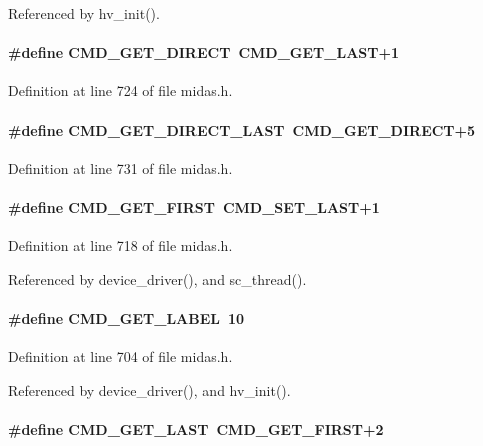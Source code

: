 Referenced by hv\_\-init().
\paragraph[{CMD\_\-GET\_\-DIRECT}]{\setlength{\rightskip}{0pt plus 5cm}\#define CMD\_\-GET\_\-DIRECT~CMD\_\-GET\_\-LAST+1}\hfill\label{group__err26_ga17b7364497ba59e4f52d2d5a5b37383f}


Definition at line 724 of file midas.h.
\paragraph[{CMD\_\-GET\_\-DIRECT\_\-LAST}]{\setlength{\rightskip}{0pt plus 5cm}\#define CMD\_\-GET\_\-DIRECT\_\-LAST~CMD\_\-GET\_\-DIRECT+5}\hfill\label{group__err26_ga4751427c28d8dae2ca3383b55f736340}


Definition at line 731 of file midas.h.
\paragraph[{CMD\_\-GET\_\-FIRST}]{\setlength{\rightskip}{0pt plus 5cm}\#define CMD\_\-GET\_\-FIRST~CMD\_\-SET\_\-LAST+1}\hfill\label{group__err26_gae7830d58842019be517f323325aaef2c}


Definition at line 718 of file midas.h.

Referenced by device\_\-driver(), and sc\_\-thread().
\paragraph[{CMD\_\-GET\_\-LABEL}]{\setlength{\rightskip}{0pt plus 5cm}\#define CMD\_\-GET\_\-LABEL~10}\hfill\label{group__err26_gacd4918f4633cc4bb4bc967382c756b9a}


Definition at line 704 of file midas.h.

Referenced by device\_\-driver(), and hv\_\-init().
\paragraph[{CMD\_\-GET\_\-LAST}]{\setlength{\rightskip}{0pt plus 5cm}\#define CMD\_\-GET\_\-LAST~CMD\_\-GET\_\-FIRST+2}\hfill\label{group__err26_ga59a67892841cce1949a4de5f3ed495fc}


